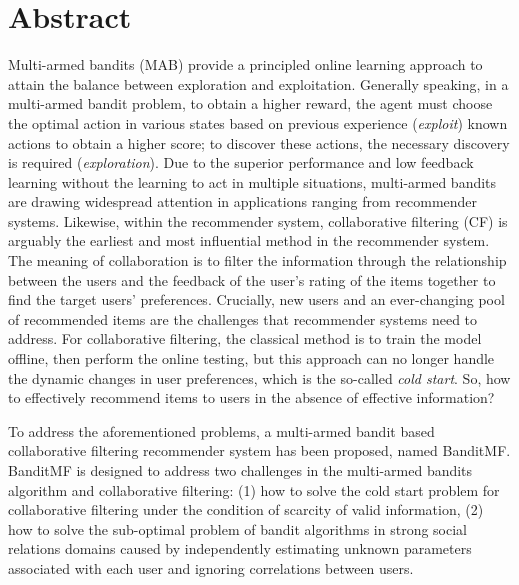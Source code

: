 \chapter*{Abstract}
Multi-armed bandits (MAB) provide a principled online learning approach to attain the balance between exploration and exploitation. Generally speaking, in a multi-armed bandit problem, to obtain a higher reward, the agent must choose the optimal action in various states based on previous experience (\textit{exploit}) known actions to obtain a higher score; to discover these actions, the necessary discovery is required (\textit{exploration}). Due to the superior performance and low feedback learning without the learning to act in multiple situations, multi-armed bandits are drawing widespread attention in applications ranging from recommender systems. Likewise, within the recommender system, collaborative filtering (CF) is arguably the earliest and most influential method in the recommender system. The meaning of collaboration is to filter the information through the relationship between the users and the feedback of the user's rating of the items together to find the target users’ preferences. Crucially, new users and an ever-changing pool of recommended items are the challenges that recommender systems need to address. For collaborative filtering, the classical method is to train the model offline, then perform the online testing, but this approach can no longer handle the dynamic changes in user preferences, which is the so-called \textit{cold start}. So, how to effectively recommend items to users in the absence of effective information?

To address the aforementioned problems, a multi-armed bandit based collaborative filtering recommender system has been proposed, named BanditMF. BanditMF is designed to address two challenges in the multi-armed bandits algorithm and collaborative filtering: (1) how to solve the cold start problem for collaborative filtering under the condition of scarcity of valid information, (2) how to solve the sub-optimal problem of bandit algorithms in strong social relations domains caused by independently estimating unknown parameters associated with each user and ignoring correlations between users.
